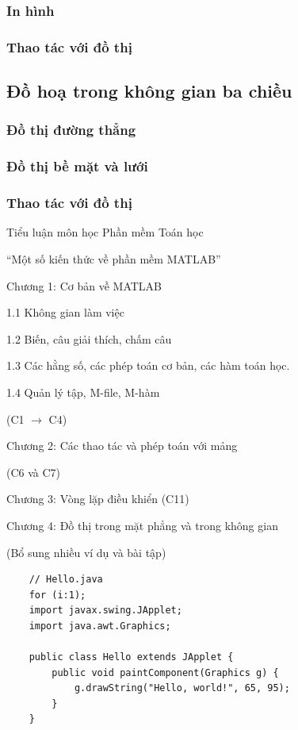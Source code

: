 \documentclass[12pt,a4paper]{article}
\begin{document}
\subsubsection{In hình}
\subsubsection{Thao tác với đồ thị}
\subsection{Đồ hoạ trong không gian ba chiều}
\subsubsection{Đồ thị đường thẳng}
\subsubsection{Đồ thị bề mặt và lưới}
\subsubsection{Thao tác với đồ thị}

	
	
	Tiểu luận môn học Phần mềm Toán học

“Một số kiến thức về phần mềm MATLAB”

Chương 1: Cơ bản về MATLAB

1.1  Không gian làm việc

1.2  Biến, câu giải thích, chấm câu

1.3  Các hằng số, các phép toán cơ bản, các hàm toán học.

1.4  Quản lý tập, M-file, M-hàm

(C1 $\rightarrow$ C4)

Chương 2: Các thao tác và phép toán với mảng

(C6 và C7)

Chương 3: Vòng lặp điều khiển (C11)

Chương 4: Đồ thị trong mặt phẳng và trong không gian

(Bổ sung nhiều ví dụ và bài tập)
	\begin{lstlisting}
	// Hello.java
	for (i:1);
	import javax.swing.JApplet;
	import java.awt.Graphics;

	public class Hello extends JApplet {
    	public void paintComponent(Graphics g) {
        	g.drawString("Hello, world!", 65, 95);
    	}    
	}
	\end{lstlisting}
	
\end{document}
